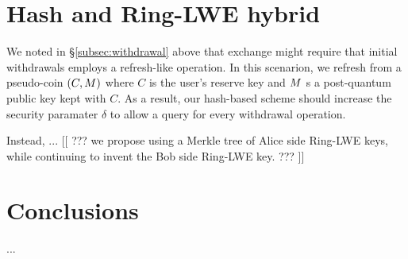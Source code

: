 \documentclass{llncs}
\begin{document}
\section{Hash and Ring-LWE hybrid}

We noted in \S\ref{subsec:withdrawal} above that exchange might
require that initial withdrawals employs a refresh-like operation.
In this scenarion, we refresh from a pseudo-coin $(C,M)$ where
 $C$ is the user's reserve key \cite[??]{Taler} and
 $M$ s a post-quantum public key kept with $C$.
As a result, our hash-based scheme should increase the security
paramater $\delta$ to allow a query for every  withdrawal operation.

Instead, ...
[[ ??? we propose using a Merkle tree of Alice side Ring-LWE keys,
while continuing to invent the Bob side Ring-LWE key. ??? ]]


\section{Conclusions}

...






\end{document}

